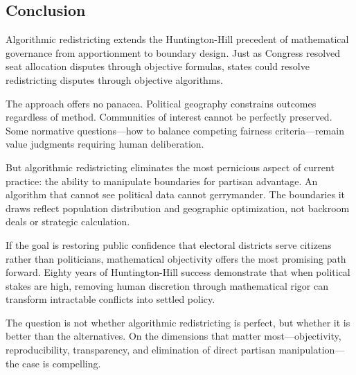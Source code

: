 \subsection{Conclusion}

Algorithmic redistricting extends the Huntington-Hill precedent of mathematical governance from apportionment to boundary design. Just as Congress resolved seat allocation disputes through objective formulas, states could resolve redistricting disputes through objective algorithms.

The approach offers no panacea. Political geography constrains outcomes regardless of method. Communities of interest cannot be perfectly preserved. Some normative questions—how to balance competing fairness criteria—remain value judgments requiring human deliberation.

But algorithmic redistricting eliminates the most pernicious aspect of current practice: the ability to manipulate boundaries for partisan advantage. An algorithm that cannot see political data cannot gerrymander. The boundaries it draws reflect population distribution and geographic optimization, not backroom deals or strategic calculation.

If the goal is restoring public confidence that electoral districts serve citizens rather than politicians, mathematical objectivity offers the most promising path forward. Eighty years of Huntington-Hill success demonstrate that when political stakes are high, removing human discretion through mathematical rigor can transform intractable conflicts into settled policy.

The question is not whether algorithmic redistricting is perfect, but whether it is better than the alternatives. On the dimensions that matter most—objectivity, reproducibility, transparency, and elimination of direct partisan manipulation—the case is compelling.
